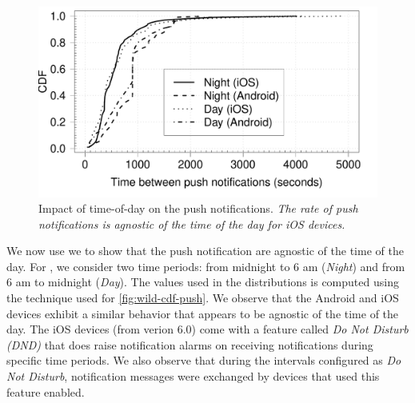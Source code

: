 \begin{figure}
\includegraphics[width=\columnwidth]{plots/cdf_night_push_comparison_device_wild.pdf}
\caption{Impact of time-of-day on the push notifications. \emph{The rate of push notifications is agnostic of the time of the day for iOS devices.}}
\label{fig:wild-cdf-push-night}
\end{figure}

We now use  we to show that the push notification are agnostic of the time of the day. 
For , we consider two time periods: from midnight to 6 am (\emph{Night}) and from 6 am to midnight (\emph{Day}).
The values used in the distributions is computed using the technique used for \ref{fig:wild-cdf-push}. 
We observe that the Android and iOS devices exhibit a similar behavior that appears to be agnostic of the time of the day. 
The iOS devices (from verion 6.0) come with a feature called \emph{Do Not Disturb (DND)} that does raise notification alarms on receiving notifications during specific time periods. 
We also observe that during the intervals configured as \emph{Do Not Disturb}, notification messages were exchanged by devices that used this feature enabled. 







